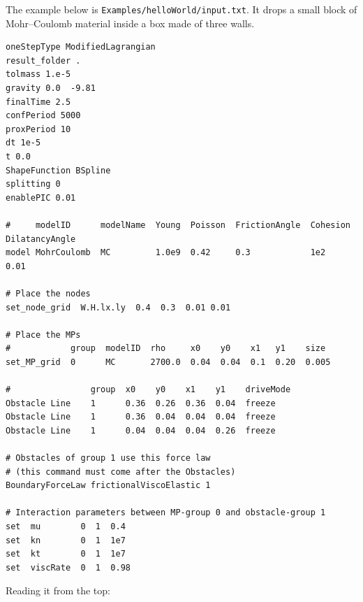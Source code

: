 \documentclass[a4paper,onecolumn,11pt]{doofus}
\begin{document}
The example below is \texttt{Examples/helloWorld/input.txt}. It drops a small block of
Mohr--Coulomb material inside a box made of three walls.

\begin{lstlisting}[style=mystyle]
oneStepType ModifiedLagrangian
result_folder .
tolmass 1.e-5
gravity 0.0  -9.81
finalTime 2.5
confPeriod 5000
proxPeriod 10
dt 1e-5
t 0.0
ShapeFunction BSpline
splitting 0
enablePIC 0.01

#     modelID      modelName  Young  Poisson  FrictionAngle  Cohesion  DilatancyAngle
model MohrCoulomb  MC         1.0e9  0.42     0.3            1e2       0.01

# Place the nodes
set_node_grid  W.H.lx.ly  0.4  0.3  0.01 0.01

# Place the MPs
#            group  modelID  rho     x0    y0    x1   y1    size
set_MP_grid  0      MC       2700.0  0.04  0.04  0.1  0.20  0.005

#                group  x0    y0    x1    y1    driveMode
Obstacle Line    1      0.36  0.26  0.36  0.04  freeze
Obstacle Line    1      0.36  0.04  0.04  0.04  freeze
Obstacle Line    1      0.04  0.04  0.04  0.26  freeze

# Obstacles of group 1 use this force law
# (this command must come after the Obstacles)
BoundaryForceLaw frictionalViscoElastic 1

# Interaction parameters between MP-group 0 and obstacle-group 1
set  mu        0  1  0.4
set  kn        0  1  1e7
set  kt        0  1  1e7
set  viscRate  0  1  0.98
\end{lstlisting}

Reading it from the top:
\end{document}
